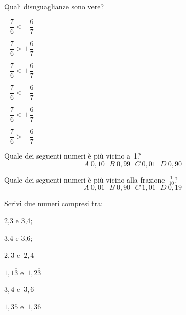 
\begin{esercizio}
\label{ese:3.39}
Quali disuguaglianze sono vere?
\begin{htmulticols}{3}
\TabPositions{2.3cm}
\begin{enumeratees}
\spazielenx
 \item \(-\dfrac{7}{6} < -\dfrac{6}{7}\) \tab\verofalso
 \item \(-\dfrac{7}{6} > +\dfrac{6}{7}\) \tab\verofalso
 \item \(-\dfrac{7}{6} < +\dfrac{6}{7}\) \tab\verofalso
 \item \(+\dfrac{7}{6} < -\dfrac{6}{7}\) \tab\verofalso
 \item \(+\dfrac{7}{6} < +\dfrac{6}{7}\) \tab\verofalso
 \item \(+\dfrac{7}{6} > -\dfrac{6}{7}\) \tab\verofalso
 \end{enumeratees}
\end{htmulticols}
\end{esercizio}

\begin{esercizio}
\label{ese:3.40}
Quale dei seguenti numeri è più vicino a~1?
\[\boxed{A} ~ 0,10 ~~~ \boxed{B} ~ 0,99 ~~~
\boxed{C} ~ 0,01 ~~~ \boxed{D} ~ 0,90\]
\end{esercizio}

 \begin{esercizio}
\label{ese:3.41}
Quale dei seguenti numeri è più vicino alla frazione~\(\frac{1}{10}\)?
\[\boxed{A} ~ 0,01 ~~~ \boxed{B} ~ 0,90 ~~~
\boxed{C} ~ 1,01 ~~~ \boxed{D} ~ 0,19\]
 \end{esercizio}

\begin{esercizio}
\label{ese:3.42}
Scrivi due numeri compresi tra:

\begin{htmulticols}{3}
\begin{enumeratees}
 \item 2,3 e 3,4;
 \item 3,4 e 3,6;
 \item \(2,\overline{3}\) e~\(2,\overline{4}\)
 \item \(1,1\overline{3}\) e~\(1,2\overline{3}\)
 \item \(3,\overline{4}\) e~\(3,\overline{6}\)
 \item \(1,\overline{35}\) e~\(1,\overline{36}\)
\end{enumeratees}
\end{htmulticols}
\end{esercizio}

